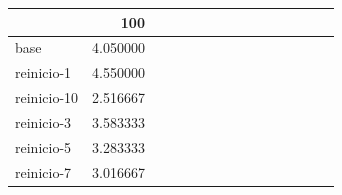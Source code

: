 \begin{tabular}{lrrrrrrrrrrrrrr}
\toprule
{} & 100 \\
\midrule
base        &  4.050000 \\
reinicio-1  &  4.550000 \\
reinicio-10 &  2.516667 \\
reinicio-3  &  3.583333 \\
reinicio-5  &  3.283333 \\
reinicio-7  & 3.016667 \\
\bottomrule
\end{tabular}
